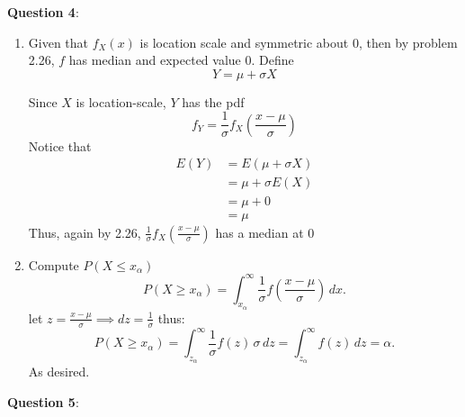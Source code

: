 \documentclass{article} %
\newcommand{\question}[2][]{
  \begin{flushleft}
    \textbf{Question #1}: \textit{#2}

\end{flushleft}}
\begin{document}
\question[4]{ }
\begin{enumerate}
  \item
    Given that $f_X(x)$ is location scale and symmetric about $0$, then by
    problem 2.26, $f$ has median and expected value $0$. Define
    \[
      Y = \mu + \sigma X
    \]

    Since $X$ is location-scale, $Y$ has the pdf
    \[
      f_Y = \frac{1}{\sigma}f_X\left(\frac{x-\mu}{\sigma}\right)
    \]
    Notice that
    \begin{align*}
      E(Y) &= E(\mu + \sigma X) \\
      &= \mu + \sigma E(X) \\
      &= \mu + 0 \\
      &= \mu
    \end{align*}
    Thus, again by 2.26,
    $\frac{1}{\sigma}f_X\left(\frac{x-\mu}{\sigma}\right)$ has a median at $0$
  \item Compute $P(X\le x_\alpha)$
    \[
      P(X \ge x_\alpha)
      = \int_{x_\alpha}^{\infty}
      \frac{1}{\sigma}
      f\!\left(\frac{x-\mu}{\sigma}\right)
      \,dx.
    \]
    let $z = \frac{x-\mu}{\sigma} \implies dz = \frac{1}{\sigma}$ thus:
    \[
      P(X \ge x_\alpha)
      = \int_{z_\alpha}^{\infty}
      \frac{1}{\sigma} f(z)\,\sigma\,dz
      = \int_{z_\alpha}^{\infty} f(z)\,dz
      = \alpha.
    \]
    As desired.
\end{enumerate}
\question[5] { }
\end{document}
